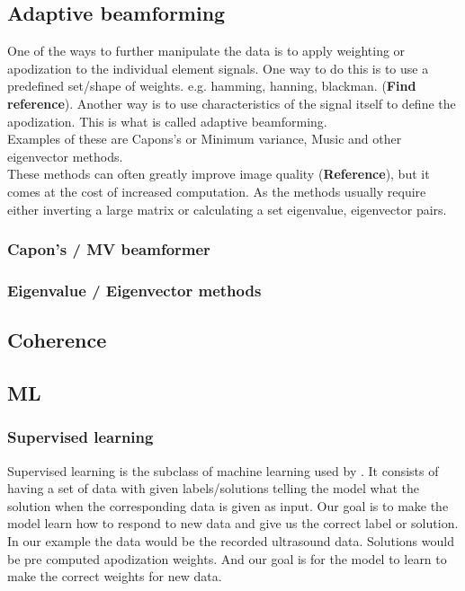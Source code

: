 \documentclass[12pt, a4paper, twoside, UKenglish]{article}
\begin{document}
\subsection{Adaptive beamforming}
One of the ways to further manipulate the data is to apply weighting or apodization to the individual element signals. One way to do this is to use a predefined set/shape of weights. e.g. hamming, hanning, blackman. (\textbf{Find reference}). Another way is to use characteristics of the signal itself to define the apodization. This is what is called adaptive beamforming.\\
Examples of these are Capons's or Minimum variance, Music and other eigenvector methods.\\
These methods can often greatly improve image quality (\textbf{Reference}), but it comes at the cost of increased computation. As the methods usually require either inverting a large matrix or calculating a set eigenvalue, eigenvector pairs.

\subsubsection{Capon's / MV beamformer}
\cite{Krim-Viberg}
\subsubsection{Eigenvalue / Eigenvector methods}
\cite{Krim-Viberg}
\subsection{Coherence}

\subsection{ML}
	
\subsubsection{Supervised learning}
Supervised learning is the subclass of machine learning used by \cite{Adaptive-Deep-Learning, Kjenstad}. It consists of having a set of data with given labels/solutions telling the model what the solution when the corresponding data is given as input. Our goal is to make the model learn how to respond to new data and give us the correct label or solution. In our example the data would be the recorded ultrasound data. Solutions would be pre computed apodization weights. And our goal is for the model to learn to make the correct weights for new data.\\
\ \\
\end{document}
